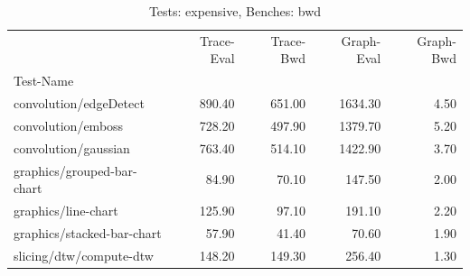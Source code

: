 \begin{table}
\caption{Tests: expensive, Benches: bwd}
\label{fig/performance/expensive-bwd}
\begin{tabular}{lrrrr}
\toprule
 & Trace-Eval & Trace-Bwd & Graph-Eval & Graph-Bwd \\
Test-Name &  &  &  &  \\
\midrule
convolution/edgeDetect & 890.40 & 651.00 & 1634.30 & 4.50 \\
convolution/emboss & 728.20 & 497.90 & 1379.70 & 5.20 \\
convolution/gaussian & 763.40 & 514.10 & 1422.90 & 3.70 \\
graphics/grouped-bar-chart & 84.90 & 70.10 & 147.50 & 2.00 \\
graphics/line-chart & 125.90 & 97.10 & 191.10 & 2.20 \\
graphics/stacked-bar-chart & 57.90 & 41.40 & 70.60 & 1.90 \\
slicing/dtw/compute-dtw & 148.20 & 149.30 & 256.40 & 1.30 \\
\bottomrule
\end{tabular}
\end{table}
